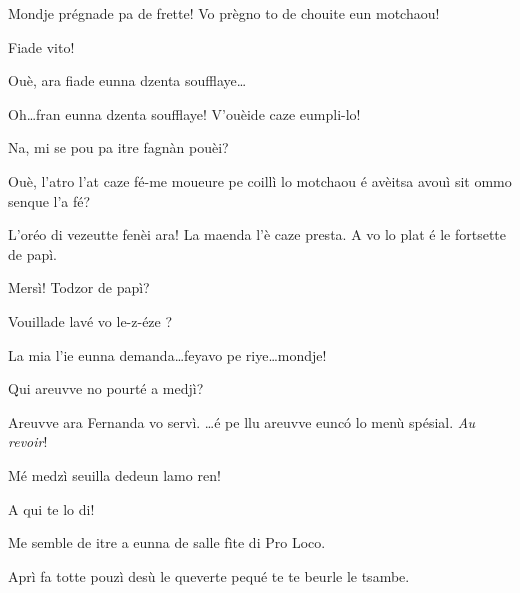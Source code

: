 \begin{drama}

\Eunfeurmispeaks Mondje prégnade pa de frette! Vo prègno to de chouite eun motchaou!


\PersEmpourtantaspeaks Fiade vito!

\Eunfeurmispeaks Ouè, ara fiade eunna dzenta soufflaye\ldots


\Eunfeurmispeaks Oh\ldots fran eunna dzenta soufflaye! V'ouèide caze eumpli-lo!

\Gerominespeaks Na, mi se pou pa itre fagnàn pouèi?

\Casimirspeaks Ouè, l’atro l’at caze fé-me moueure pe coillì lo motchaou é avèitsa avouì sit ommo senque l’a fé? 




\Eunfeurmiespeaks L’oréo di vezeutte fenèi ara!  La maenda l’è caze presta. A vo lo plat é le fortsette de papì.


\Gerominespeaks Mersì! Todzor de papì?

\Eunfeurmiespeaks Vouillade lavé vo le-z-éze \posate?

\Gerominespeaks La mia l'ie eunna demanda\ldots feyavo pe riye\ldots mondje!

\Casimirspeaks Qui areuvve no pourté a medjì?

\Eunfeurmiespeaks Areuvve ara Fernanda vo servì.  \ldots é pe llu  areuvve eunc\'o lo menù spésial. \textit{Au revoir}!


\Casimirspeaks{} Mé medzì seuilla dedeun lamo ren!

\Gerominespeaks A qui te lo di!

\Casimirspeaks Me semble de itre a eunna de salle fìte di Pro Loco.

\Gerominespeaks Aprì fa totte pouzì desù le queverte pequé te te beurle le tsambe.


\end{drama}
